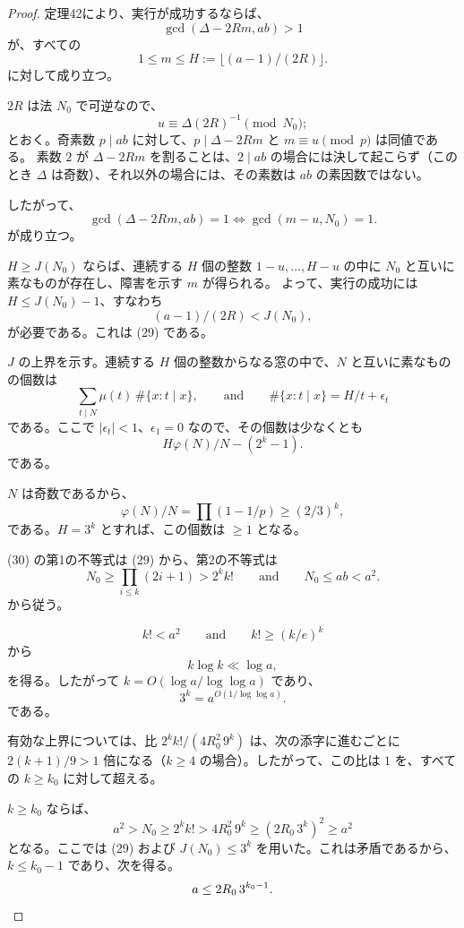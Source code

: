 \documentclass[11pt,reqno]{amsart}
\theoremstyle{definition}
\theoremstyle{definition}
\theoremstyle{remark}
\begin{document}
\begin{proof}\leavevmode\label{proof:44}
定理42により、実行が成功するならば、
\[
\gcd(\Delta-2Rm,ab)>1
\]
が、すべての
\[
1\le m\le H:=\lfloor(a-1)/(2R)\rfloor.
\]
に対して成り立つ。

\(2R\) は法 \(N_0\) で可逆なので、
\[
u\equiv\Delta(2R)^{-1}\pmod{N_0};
\]
とおく。奇素数 \(p\mid ab\) に対して、\(p\mid\Delta-2Rm\) と \(m\equiv u\pmod p\) は同値である。
素数 \(2\) が \(\Delta-2Rm\) を割ることは、\(2\mid ab\) の場合には決して起こらず（このとき \(\Delta\) は奇数）、それ以外の場合には、その素数は \(ab\) の素因数ではない。

したがって、
\[
\gcd(\Delta-2Rm,ab)=1\iff\gcd(m-u,N_0)=1.
\]
が成り立つ。

\(H\ge J(N_0)\) ならば、連続する \(H\) 個の整数 \(1-u,\ldots,H-u\) の中に \(N_0\) と互いに素なものが存在し、障害を示す \(m\) が得られる。
よって、実行の成功には \(H\le J(N_0)-1\)、すなわち
\[
(a-1)/(2R)<J(N_0),
\]
が必要である。これは (29) である。

\(J\) の上界を示す。連続する \(H\) 個の整数からなる窓の中で、\(N\) と互いに素なものの個数は
\[
\sum_{t\mid N}\mu(t)\,\#\{x:t\mid x\},
\qquad\text{and}\qquad
\#\{x:t\mid x\}=H/t+\epsilon_t
\]
である。ここで \(|\epsilon_t|<1\)、\(\epsilon_1=0\) なので、その個数は少なくとも
\[
H\varphi(N)/N-(2^k-1).
\]
である。

\(N\) は奇数であるから、
\[
\varphi(N)/N=\prod(1-1/p)\ge(2/3)^k,
\]
である。\(H=3^k\) とすれば、この個数は \(\ge1\) となる。

(30) の第1の不等式は (29) から、第2の不等式は
\[
N_0\ge\prod_{i\le k}(2i+1)>2^kk!\qquad \text{and}\qquad N_0\le ab<a^2.
\]
から従う。

\[
k!<a^2\qquad \text{and}\qquad k!\ge(k/e)^k
\]
から
\[
k\log k\ll\log a,
\]
を得る。したがって \(k=O(\log a/\log\log a)\) であり、
\[
3^k=a^{O(1/\log\log a)}.
\]
である。

有効な上界については、比 \(2^kk!/(4R_0^2\,9^k)\) は、次の添字に進むごとに \(2(k+1)/9>1\) 倍になる（\(k\ge4\) の場合）。したがって、この比は \(1\) を、すべての \(k\ge k_0\) に対して超える。

\(k\ge k_0\) ならば、
\[
a^2>N_0\ge2^kk!>4R_0^2\,9^k\ge(2R_0\,3^k)^2\ge a^2
\]
となる。ここでは (29) および \(J(N_0)\le3^k\) を用いた。これは矛盾であるから、\(k\le k_0-1\) であり、次を得る。
\[
a\le2R_0\,3^{k_0-1}.\qedhere
\]
\end{proof}
\end{document}
